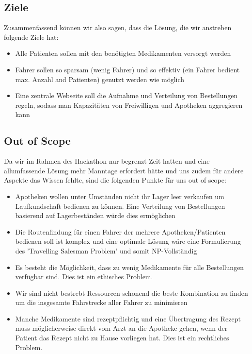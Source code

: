 \documentclass[a4]{article}
\begin{document}
\subsection{Ziele}

Zusammenfassend können wir also sagen, dass die Lösung, die wir anstreben folgende Ziele hat:

\begin{itemize}
\item Alle Patienten sollen mit den benötigten Medikamenten versorgt werden
\item Fahrer sollen so sparsam (wenig Fahrer) und so effektiv (ein Fahrer bedient max. Anzahl and Patienten) genutzt werden wie möglich
\item Eine zentrale Webseite soll die Aufnahme und Verteilung von Bestellungen regeln, sodass man Kapazitäten von Freiwilligen und Apotheken aggregieren kann
\end{itemize}

\subsection{Out of Scope}

Da wir im Rahmen des Hackathon nur begrenzt Zeit hatten und eine allumfassende Lösung mehr Manntage erfordert hätte und uns zudem für andere Aspekte das Wissen fehlte, sind die folgenden Punkte für uns out of scope:

\begin{itemize}
\item Apotheken wollen unter Umständen nicht ihr Lager leer verkaufen um Laufkundschaft bedienen zu können. Eine Verteilung von Bestellungen basierend auf Lagerbeständen würde dies ermöglichen
\item Die Routenfindung für einen Fahrer der mehrere Apotheken/Patienten bedienen soll ist komplex und eine optimale Lösung wäre eine Formulierung des 'Travelling Salesman Problem' und somit NP-Vollständig
\item Es besteht die Möglichkeit, dass zu wenig Medikamente für alle Bestellungen verfügbar sind. Dies ist ein ethisches Problem.
\item Wir sind nicht bestrebt Ressourcen schonend die beste Kombination zu finden um die insgesamte Fahrstrecke aller Fahrer zu minimieren
\item Manche Medikamente sind rezeptpflichtig und eine Übertragung des Rezept muss möglicherweise direkt vom Arzt an die Apotheke gehen, wenn der Patient das Rezept nicht zu Hause vorliegen hat. Dies ist ein rechtliches Problem.
\end{itemize}
\end{document}
